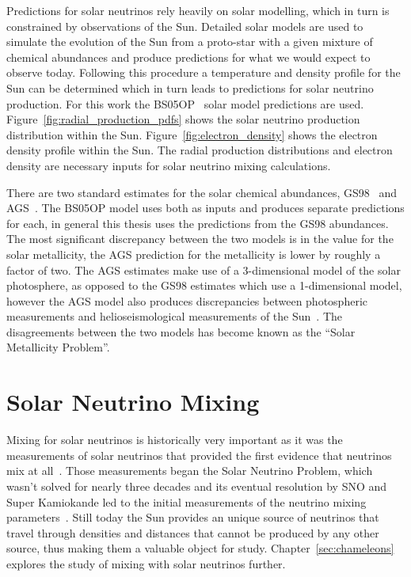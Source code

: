 Predictions for solar neutrinos rely heavily on solar modelling, which in turn
is constrained by observations of the Sun.
Detailed solar models are used to simulate the evolution of the Sun from a proto-star
with a given mixture of chemical abundances and produce predictions for
what we would expect to observe today.
Following this procedure a temperature and density profile for the Sun can be determined
which in turn leads to predictions for solar neutrino production.
For this work the BS05OP~\cite{bs_ssm} solar model predictions are used.
Figure~\ref{fig:radial_production_pdfs} shows the solar neutrino production
distribution within the Sun.
Figure~\ref{fig:electron_density} shows the electron density profile within
the Sun.
The radial production distributions and electron density are necessary inputs
for solar neutrino mixing calculations.

There are two standard estimates for the solar chemical abundances,
GS98~\cite{gs98} and AGS~\cite{ags}.
The BS05OP model uses both as inputs and produces separate predictions for each,
in general this thesis uses the predictions from the GS98 abundances.
The most significant discrepancy between the two models is in the value
for the solar metallicity, the AGS prediction for the metallicity is
lower by roughly a factor of two.
The AGS estimates make use of a 3-dimensional model of the solar photosphere,
as opposed to the GS98 estimates which use a 1-dimensional model, however
the AGS model also produces discrepancies between photospheric measurements
and helioseismological measurements of the Sun~\cite{ags, bahcall01}.
The disagreements between the two models has become known as the
``Solar Metallicity Problem''.

\section{Solar Neutrino Mixing}
Mixing for solar neutrinos is historically very important as it was
the measurements of solar neutrinos that provided the first evidence that
neutrinos mix at all~\cite{homestake,solar_nu_problem}.
Those measurements began the Solar Neutrino Problem, which wasn't solved
for nearly three decades and its eventual resolution by SNO and Super Kamiokande
led to the initial measurements of the neutrino mixing parameters~\cite{superk_atmospherics,
sno_second}.
Still today the Sun provides an unique source of neutrinos that travel through
densities and distances that cannot be produced by any other source, thus making
them a valuable object for study.
Chapter~\ref{sec:chameleons} explores the study of mixing with
solar neutrinos further.

